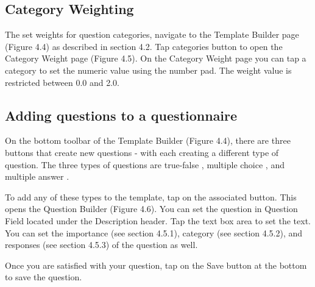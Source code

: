 \subsection{Category Weighting}
\label{sec:categoryweight}
The set weights for question categories, navigate to the Template Builder page (Figure 4.4) as described in section 4.2.  Tap categories button    to open the Category Weight page (Figure 4.5).  On the Category Weight page you can tap a category to set the numeric value using the number pad.  The weight value is restricted between 0.0 and 2.0.

\subsection{Adding questions to a questionnaire}
\label{sec:addquestion}
On the bottom toolbar of the Template Builder (Figure 4.4), there are three buttons that create new questions - with each creating a different type of question. The three types of questions are  true-false  , multiple choice  , and multiple answer  . 

To add any of these types to the template, tap on the associated button.  This opens the Question Builder (Figure 4.6).  You can set the question in Question Field located under the Description header. Tap the text box area to set the text.  You can set the importance (see section 4.5.1),  category (see section 4.5.2), and responses (see section 4.5.3) of the question as well.

Once you are satisfied with your question, tap on the Save button at the bottom to save the question. 

